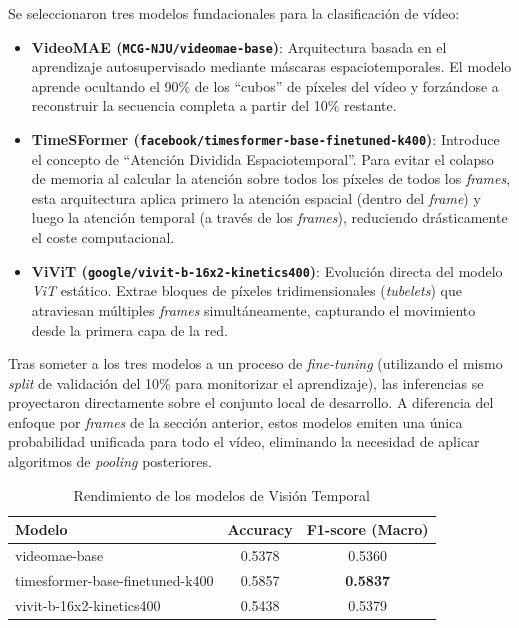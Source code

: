 Se seleccionaron tres modelos fundacionales para la clasificación de vídeo:
\begin{itemize}
    \item \textbf{VideoMAE (\texttt{MCG-NJU/videomae-base})}: Arquitectura basada en el aprendizaje autosupervisado mediante máscaras espaciotemporales. El modelo aprende ocultando el 90\% de los ``cubos'' de píxeles del vídeo y forzándose a reconstruir la secuencia completa a partir del 10\% restante. 
    \item \textbf{TimeSFormer (\texttt{facebook/timesformer-base-finetuned-k400})}: Introduce el concepto de ``Atención Dividida Espaciotemporal''. Para evitar el colapso de memoria al calcular la atención sobre todos los píxeles de todos los \textit{frames}, esta arquitectura aplica primero la atención espacial (dentro del \textit{frame}) y luego la atención temporal (a través de los \textit{frames}), reduciendo drásticamente el coste computacional. 
    \item \textbf{ViViT (\texttt{google/vivit-b-16x2-kinetics400})}: Evolución directa del modelo \textit{ViT} estático. Extrae bloques de píxeles tridimensionales (\textit{tubelets}) que atraviesan múltiples \textit{frames} simultáneamente, capturando el movimiento desde la primera capa de la red. 
\end{itemize}

Tras someter a los tres modelos a un proceso de \textit{fine-tuning} (utilizando el mismo \textit{split} de validación del 10\% para monitorizar el aprendizaje), las inferencias se proyectaron directamente sobre el conjunto local de desarrollo. A diferencia del enfoque por \textit{frames} de la sección anterior, estos modelos emiten una única probabilidad unificada para todo el vídeo, eliminando la necesidad de aplicar algoritmos de \textit{pooling} posteriores. 

\begin{table}[H]
    \centering
    \begin{tabular}{lcc}
        \toprule
        \textbf{Modelo} & \textbf{Accuracy} & \textbf{F1-score (Macro)} \\
        \midrule 
            videomae-base  & 0.5378 & 0.5360 \\
            timesformer-base-finetuned-k400   & 0.5857 & \textbf{0.5837} \\
            vivit-b-16x2-kinetics400   & 0.5438 & 0.5379 \\
        \bottomrule
    \end{tabular}
    \caption{Rendimiento de los modelos de Visión Temporal}
    \label{tab:ResultadosModelosVisionTemporal}
\end{table}

